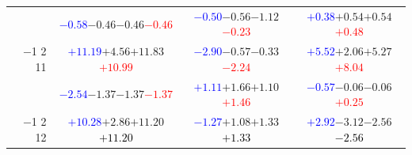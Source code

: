 \documentclass[compress]{beamer}
\begin{document}
\begin{frame}
\begin{tabular}{r | c | c | c}
          & \textcolor{blue}{$-0.58$}\hspace{0.1 cm}$-0.46$\hspace{0.1 cm}$-0.46$\hspace{0.1 cm}\textcolor{red}{$-0.46$} & \textcolor{blue}{$-0.50$}\hspace{0.1 cm}$-0.56$\hspace{0.1 cm}$-1.12$\hspace{0.1 cm}\textcolor{red}{$-0.23$} & \textcolor{blue}{$+0.38$}\hspace{0.1 cm}$+0.54$\hspace{0.1 cm}$+0.54$\hspace{0.1 cm}\textcolor{red}{$+0.48$} \\
$-$1 2 11 & \textcolor{blue}{$+11.19$}\hspace{0.1 cm}$+4.56$\hspace{0.1 cm}$+11.83$\hspace{0.1 cm}\textcolor{red}{$+10.99$} & \textcolor{blue}{$-2.90$}\hspace{0.1 cm}$-0.57$\hspace{0.1 cm}$-0.33$\hspace{0.1 cm}\textcolor{red}{$-2.24$} & \textcolor{blue}{$+5.52$}\hspace{0.1 cm}$+2.06$\hspace{0.1 cm}$+5.27$\hspace{0.1 cm}\textcolor{red}{$+8.04$} \\
          & \textcolor{blue}{$-2.54$}\hspace{0.1 cm}$-1.37$\hspace{0.1 cm}$-1.37$\hspace{0.1 cm}\textcolor{red}{$-1.37$} & \textcolor{blue}{$+1.11$}\hspace{0.1 cm}$+1.66$\hspace{0.1 cm}$+1.10$\hspace{0.1 cm}\textcolor{red}{$+1.46$} & \textcolor{blue}{$-0.57$}\hspace{0.1 cm}$-0.06$\hspace{0.1 cm}$-0.06$\hspace{0.1 cm}\textcolor{red}{$+0.25$} \\
$-$1 2 12 & \textcolor{blue}{$+10.28$}\hspace{0.1 cm}$+2.86$\hspace{0.1 cm}$+11.20$\hspace{0.1 cm}\textcolor{black}{$+11.20$} & \textcolor{blue}{$-1.27$}\hspace{0.1 cm}$+1.08$\hspace{0.1 cm}$+1.33$\hspace{0.1 cm}\textcolor{black}{$+1.33$} & \textcolor{blue}{$+2.92$}\hspace{0.1 cm}$-3.12$\hspace{0.1 cm}$-2.56$\hspace{0.1 cm}\textcolor{black}{$-2.56$} \\

\end{tabular}
\end{frame}
\end{document}
